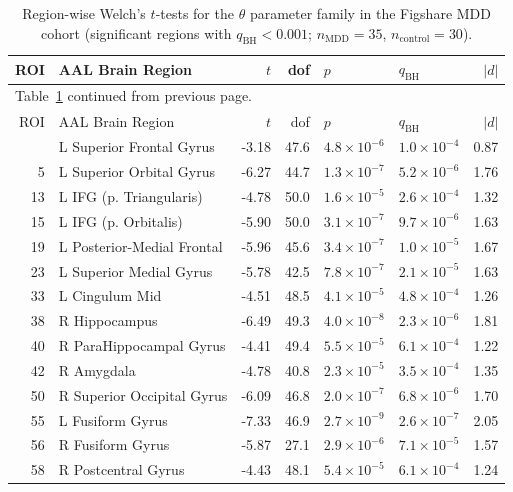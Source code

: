 \documentclass[11pt]{article}
\begin{document}
\begin{longtable}{r p{} r r l l r}
\caption{Region-wise Welch's $t$-tests for the \texttt{$\theta$} parameter family in the Figshare MDD cohort (significant regions with $q_{\mathrm{BH}}<0.001$; $n_{\mathrm{MDD}}=35$, $n_{\mathrm{control}}=30$).}
\label{tab:supp_mdd_theta_stats}\\
\toprule
ROI & AAL Brain Region & $t$ & dof & $p$ & $q_{\mathrm{BH}}$ & $|d|$ \\
\midrule
\endfirsthead
\multicolumn{7}{l}{\small Table~\ref{tab:supp_mdd_theta_stats} continued from previous page.}\\
\toprule
ROI & AAL Brain Region & $t$ & dof & $p$ & $q_{\mathrm{BH}}$ & $|d|$ \\
\midrule
\endhead
\bottomrule
\endfoot
3  & L Superior Frontal Gyrus & -3.18 & 47.6 & $4.8\times10^{-6}$  & $1.0\times10^{-4}$ & 0.87 \\
5  & L Superior Orbital Gyrus & -6.27 & 44.7 & $1.3\times10^{-7}$ & $5.2\times10^{-6}$ & 1.76 \\
13 & L IFG (p. Triangularis) & -4.78 & 50.0 & $1.6\times10^{-5}$ & $2.6\times10^{-4}$ & 1.32 \\
15 & L IFG (p. Orbitalis) & -5.90 & 50.0 & $3.1\times10^{-7}$ & $9.7\times10^{-6}$ & 1.63 \\
19 & L Posterior-Medial Frontal & -5.96 & 45.6 & $3.4\times10^{-7}$ & $1.0\times10^{-5}$ & 1.67 \\
23 & L Superior Medial Gyrus & -5.78 & 42.5 & $7.8\times10^{-7}$ & $2.1\times10^{-5}$ & 1.63 \\
33 & L Cingulum Mid & -4.51 & 48.5 & $4.1\times10^{-5}$ & $4.8\times10^{-4}$ & 1.26 \\
38 & R Hippocampus & -6.49 & 49.3 & $4.0\times10^{-8}$ & $2.3\times10^{-6}$ & 1.81 \\
40 & R ParaHippocampal Gyrus & -4.41 & 49.4 & $5.5\times10^{-5}$ & $6.1\times10^{-4}$ & 1.22 \\
42 & R Amygdala & -4.78 & 40.8 & $2.3\times10^{-5}$ & $3.5\times10^{-4}$ & 1.35 \\
50 & R Superior Occipital Gyrus & -6.09 & 46.8 & $2.0\times10^{-7}$ & $6.8\times10^{-6}$ & 1.70 \\
55 & L Fusiform Gyrus & -7.33 & 46.9 & $2.7\times10^{-9}$ & $2.6\times10^{-7}$ & 2.05 \\
56 & R Fusiform Gyrus & -5.87 & 27.1 & $2.9\times10^{-6}$ & $7.1\times10^{-5}$ & 1.57 \\
58 & R Postcentral Gyrus & -4.43 & 48.1 & $5.4\times10^{-5}$ & $6.1\times10^{-4}$ & 1.24 \\

\end{longtable}
\end{document}
